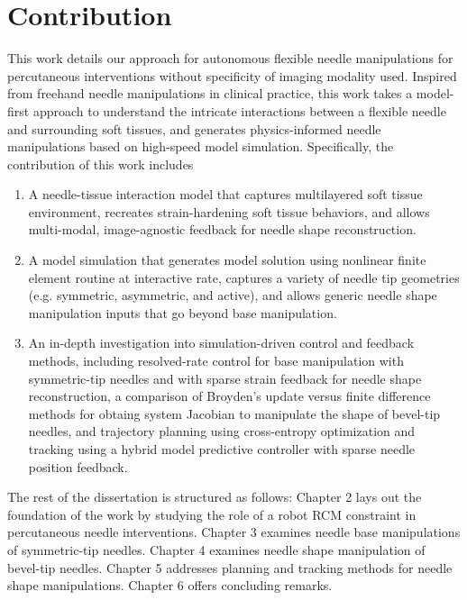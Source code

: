 






\section{Contribution}
\label{sec:contribution}

This work details our approach for autonomous flexible needle manipulations for percutaneous interventions without specificity of imaging modality used. Inspired from freehand needle manipulations in clinical practice, this work takes a model-first approach to understand the intricate interactions between a flexible needle and surrounding soft tissues, and generates physics-informed needle manipulations based on high-speed model simulation. Specifically, the contribution of this work includes
\begin{enumerate}[label*=\arabic*.]
\item A needle-tissue interaction model that captures multilayered soft tissue environment, recreates strain-hardening soft tissue behaviors, and allows multi-modal, image-agnostic feedback for needle shape reconstruction.
\item A model simulation that generates model solution using nonlinear finite element routine at interactive rate, captures a variety of needle tip geometries (e.g. symmetric, asymmetric, and active), and allows generic needle shape manipulation inputs that go beyond base manipulation.
\item An in-depth investigation into simulation-driven control and feedback methods, including resolved-rate control for base manipulation with symmetric-tip needles and with sparse strain feedback for needle shape reconstruction, a comparison of Broyden's update versus finite difference methods for obtaing system Jacobian to manipulate the shape of bevel-tip needles, and trajectory planning using cross-entropy optimization and tracking using a hybrid model predictive controller with sparse needle position feedback.
\end{enumerate}

The rest of the dissertation is structured as follows: Chapter 2 lays out the foundation of the work by studying the role of a robot RCM constraint in percutaneous needle interventions. Chapter 3 examines needle base manipulations of symmetric-tip needles. Chapter 4 examines needle shape manipulation of bevel-tip needles. Chapter 5 addresses planning and tracking methods for needle shape manipulations. Chapter 6 offers concluding remarks.

